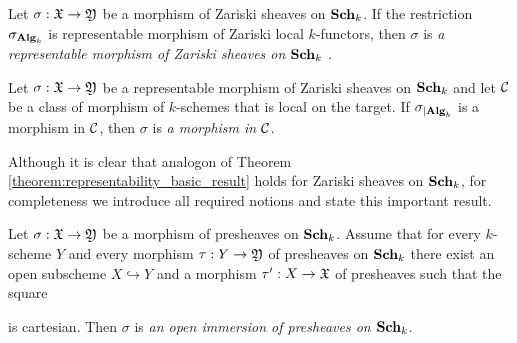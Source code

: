 \begin{definition}
Let $\sigma:{\mathfrak X}\rightarrow {\mathfrak Y}$ be a morphism of Zariski sheaves on $\mathbf{Sch}_k$. If the restriction $\sigma_{\mathbf{Alg}_k}$ is representable morphism of Zariski local $k$-functors, then $\sigma$ is \textit{a representable morphism of Zariski sheaves on $\mathbf{Sch}_k$} .
\end{definition}

\begin{definition}
Let $\sigma:{\mathfrak X}\rightarrow {\mathfrak Y}$ be a representable morphism of Zariski sheaves on $\mathbf{Sch}_k$ and let ${\mathcal C}$ be a class of morphism of $k$-schemes that is local on the target. If $\sigma_{\mid \mathbf{Alg}_k}$ is a morphism in ${\mathcal C}$, then $\sigma$ is \textit{a morphism in ${\mathcal C}$}.
\end{definition}
\noindent
Although it is clear that analogon of Theorem \ref{theorem:representability_basic_result} holds for Zariski sheaves on $\mathbf{Sch}_k$, for completeness we introduce all required notions and state this important result.

\begin{definition}
Let $\sigma:{\mathfrak X}\rightarrow {\mathfrak Y}$ be a morphism of presheaves on $\mathbf{Sch}_k$. Assume that for every $k$-scheme $Y$ and every morphism $\tau:Y \rightarrow {\mathfrak Y}$ of presheaves on $\mathbf{Sch}_k$ there exist an open subscheme $X\hookrightarrow Y$ and a morphism $\tau':X \rightarrow {\mathfrak X}$ of presheaves such that the square
\begin{center}
\end{center}
is cartesian. Then $\sigma$ is \textit{an open immersion of presheaves on $\mathbf{Sch}_k$}.
\end{definition}

